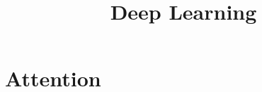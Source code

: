 





\newcommand{\titlefigure}{plots/attention3.png}
\newcommand{\learninggoals}{
  \item Familiarize with the most recent sequence data modeling technique:
\begin{itemize}
\item \footnotesize Attention Mechanism
  \item \footnotesize Transformers
\end{itemize}
  \item Get to know the CNN alternative to RNNs
}

\title{Deep Learning}
\date{}







\section{Attention}


